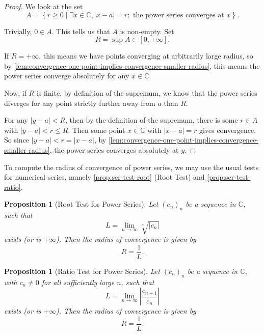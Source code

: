 \documentclass[11pt]{article}
\numberwithin{equation}{section}
\newtheorem{proposition}[theorem]{Proposition}
\theoremstyle{definition}
\theoremstyle{remark}
\newcommand{\pqty}[1]{\left(#1\right)}
\newcommand{\abs}[1]{\left|#1\right|}
\newcommand{\set}[2]{\left\{#1\mid #2\right\}}
\newcommand{\ccintv}[2]{[#1,#2]}
\newcommand{\CC}{\mathbb C}
\newcommand{\plusinfty}{+\infty}
\begin{document}
\begin{proof}
    We look at the set
    \[
        A = \set{r \geq 0}{\exists x \in \CC, \abs{x - a} = r: \text{ the power series converges at }x}.
    \]

    Trivially, \(0 \in A\). This tells us that \(A\) is non-empty. Set
    \[
        R = \sup A \in \ccintv{0}{\plusinfty}.
    \]

    If \(R = \plusinfty\), this means we have points converging at arbitrarily large radius, so by \autoref{lem:convergence-one-point-implies-convergence-smaller-radius}, this means the power series converge absolutely for any \(x \in \CC\).

    Now, if \(R\) is finite, by definition of the supremum, we know that the power series diverges for any point strictly further away from \(a\) than \(R\).
    
    For any \(\abs{y - a} < R\), then by the definition of the supremum, there is some \(r \in A\) with \(\abs{y - a} < r \leq R\). Then some point \(x\in\mathbb C\) with \(|x-a|=r\) gives convergence. So since \(\abs{y - a} < r = \abs{x - a}\), by \autoref{lem:convergence-one-point-implies-convergence-smaller-radius}, the power series converges absolutely at \(y\).
\end{proof}

To compute the radius of convergence of power series, we may use the usual tests for numerical series, namely \autoref{prop:ser-test-root} (Root Test) and \autoref{prop:ser-test-ratio}.

\begin{proposition}[Root Test for Power Series]\label{analysis-unit-0206}
    \label{prop:power-series-test-root}%
    Let \(\pqty{c_n}_n\) be a sequence in \(\CC\), such that
    \[
        L = \lim_{n \to \infty} \sqrt[n]{\abs{c_n}}
    \]
    exists (or is \(\plusinfty\)). Then the radius of convergence is given by
    \[
        R = \frac{1}{L}.
    \]
\end{proposition}

\begin{proposition}[Ratio Test for Power Series]\label{analysis-unit-0207}
    \label{prop:power-series-test-ratio}%
    Let \(\pqty{c_n}_n\) be a sequence in \(\CC\), with \(c_n\ne0\) for all sufficiently large \(n\), such that
    \[
        L = \lim_{n \to \infty} \abs{\frac{c_{n + 1}}{c_n}}
    \]
    exists (or is \(\plusinfty\)). Then the radius of convergence is given by
    \[
        R = \frac{1}{L}.
    \]
\end{proposition}
\end{document}
